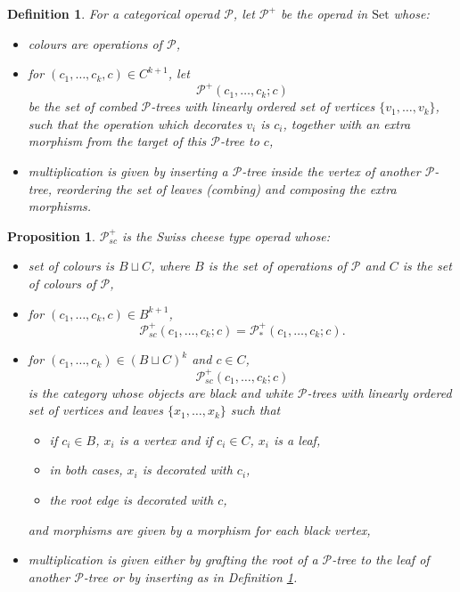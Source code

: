 \documentclass[10pt,a4paper]{amsart}
\newtheorem{definition}{Definition}
\newtheorem{proposition}{Proposition}
\begin{document}
\begin{definition}\label{definitionpplus}
	For a categorical operad $\mathcal{P}$, let $\mathcal{P}^+$ be the operad in $\mathrm{Set}$ whose:
	\begin{itemize}
		\item colours are operations of $\mathcal{P}$,
		\item for $(c_1,\ldots,c_k,c) \in C^{k+1}$, let
		\[
		\mathcal{P}^+(c_1,\ldots,c_k;c)
		\]
		be the set of combed $\mathcal{P}$-trees with linearly ordered set of vertices $\{v_1,\ldots,v_k\}$, such that the operation which decorates $v_i$ is $c_i$, together with an extra morphism from the target of this $\mathcal{P}$-tree to $c$,
		\item multiplication is given by inserting a $\mathcal{P}$-tree inside the vertex of another $\mathcal{P}$-tree, reordering the set of leaves (combing) and composing the extra morphisms.
	\end{itemize}
\end{definition}

\begin{proposition}\label{propositionswisscheeseplus}
	$\mathcal{P}_{sc}^+$ is the Swiss cheese type operad whose:
	\begin{itemize}
		\item set of colours is $B \sqcup C$, where $B$ is the set of operations of $\mathcal{P}$ and $C$ is the set of colours of $\mathcal{P}$,
		\item for $(c_1,\ldots,c_k,c) \in B^{k+1}$,
		\[
			\mathcal{P}_{sc}^+(c_1,\ldots,c_k;c) = \mathcal{P}_*^+(c_1,\ldots,c_k;c).
		\]
		\item for $(c_1,\ldots,c_k) \in (B \sqcup C)^k$ and $c \in C$,
		\[
		\mathcal{P}_{sc}^+(c_1,\ldots,c_k;c)
		\]
		is the category whose objects are black and white $\mathcal{P}$-trees with linearly ordered set of vertices and leaves $\{x_1,\ldots,x_k\}$ such that
		\begin{itemize}
			\item if $c_i \in B$, $x_i$ is a vertex and if $c_i \in C$, $x_i$ is a leaf,
			\item in both cases, $x_i$ is decorated with $c_i$,
			\item the root edge is decorated with $c$,
		\end{itemize}
		and morphisms are given by a morphism for each black vertex,
		\item multiplication is given either by grafting the root of a $\mathcal{P}$-tree to the leaf of another $\mathcal{P}$-tree or by inserting as in Definition \ref{definitionpplus}.
	\end{itemize}
\end{proposition}
\end{document}
